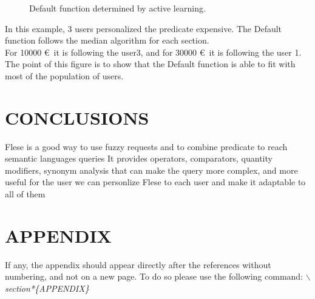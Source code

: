 \documentclass[a4paper,twoside]{article}
\begin{document}
\begin{figure}[!h]
  \centering
   {}
  \caption{Default function determined by active learning.}
  \label{fig:activelearning}
 \end{figure}

In this example, 3 users personalized the predicate expensive. The Default function follows the median algorithm for each section. \\

For 10000 \euro\, it is following the user3, and for 30000 \euro\, it is following the user 1. The point of this figure is to show that the Default function is able to fit with most of the population of users.

\section{\uppercase{Conclusions}}
\label{sec:conclusion}

Flese is a good way to use fuzzy requests and to combine predicate to reach semantic languages queries
It provides operators, comparators, quantity modifiers, synonym analysis that can make the query more complex, and more useful for the user
we can personlize Flese to each user and make it adaptable to all of them


\vfill

{\small
}


\section*{\uppercase{Appendix}}

If any, the appendix should appear directly after the
references without numbering, and not on a new page. To do so please use the following command:
\textit{$\backslash$section*\{APPENDIX\}}

\vfill
\end{document}
